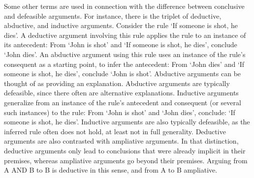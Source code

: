 \documentclass[10pt]{article}
\begin{document}
Some other terms are used in connection with the difference between conclusive and defeasible arguments. For instance, there is the triplet of deductive, abductive, and inductive arguments. Consider the rule `If someone is shot, he dies'. A deductive argument involving this rule applies the rule to an instance of its antecedent: From `John is shot' and `If someone is shot, he dies', conclude `John dies'. An abductive argument using this rule uses an instance of the rule's consequent as a starting point, to infer the antecedent: From `John dies' and  `If someone is shot, he dies', conclude `John is shot'. Abductive arguments can be thought of as providing an explanation. Abductive arguments are typically defeasible, since there often are alternative explanations. Inductive arguments generalize from an instance of the rule's antecedent and consequent (or several such instances) to the rule: From `John is shot' and `John dies', conclude: `If someone is shot, he dies'. Inductive arguments are also typically defeasible, as the inferred rule often does not hold, at least not in full generality. Deductive arguments are also contrasted with ampliative arguments. In that distinction, deductive arguments only lead to conclusions that were already implicit in their premises, whereas ampliative arguments go beyond their premises. Arguing from A AND B to B is deductive in this sense, and from A to B ampliative.

\end{document}
